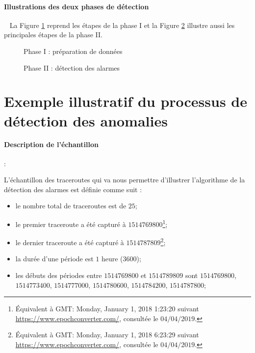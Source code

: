 \paragraph{ Illustrations des deux phases de détection}~
La Figure  \ref{fig:step-preparing-data} reprend les étapes de la phase I et
la Figure \ref{fig:step-detection-anomalies} illustre aussi les principales étapes  de la phase II.
\newpage

\begin{figure}[H]
	\centering
	\captionsetup{justification=centering}
	\resizebox{!}{\textheight}{
		
	}
	\caption{Phase I : préparation de données }
	\label{fig:step-preparing-data}
\end{figure}

\begin{figure}[H]
	\centering
	\captionsetup{justification=centering}
	\resizebox{\textwidth}{\textheight}{
		
	}
	\caption{Phase II : détection des alarmes }
	\label{fig:step-detection-anomalies}
\end{figure}



\section{Exemple illustratif du processus de détection des anomalies}

\paragraph{Description de  l'échantillon} :

L'échantillon des traceroutes qui va nous permettre d'illustrer l'algorithme de la détection des alarmes est définie comme suit :

\begin{itemize}
	\item le nombre total de traceroutes est de $25$;
	\item le premier traceroute a été capturé à $1514769800$\footnote{Équivalent à GMT: Monday, January 1, 2018 1:23:20 suivant \url{https://www.epochconverter.com/}, consultée le $04/04/2019$.};
	\item le dernier traceroute a été capturé à $1514787809$\footnote{Équivalent à GMT: Monday, January 1, 2018 6:23:29 suivant \url{https://www.epochconverter.com/}, consultée le $04/04/2019$.};
	\item la durée d'une période est $1$ heure ($3600$);
	\item les débuts des périodes entre $ 1514769800 $ et $ 1514789809 $ sont  $ 1514769800 $, $ 1514773400 $, $ 1514777000 $, $ 1514780600 $, $ 1514784200 $, $ 1514787800 $;
\end{itemize} 



